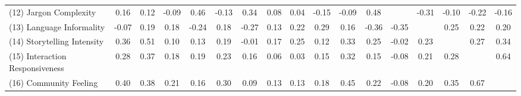 \begin{landscape}
\begin{table}[!ht]
\begin{tabular}{lcccccccccccccccc}
      (12) Jargon Complexity          & 0.16  & 0.12 & -0.09 & 0.46  & -0.13 & 0.34  & 0.08  & 0.04  & -0.15 & -0.09 & 0.48  &       & -0.31 & -0.10 & -0.22 & -0.16 \\
      (13) Language Informality       & -0.07 & 0.19 & 0.18  & -0.24 & 0.18  & -0.27 & 0.13  & 0.22  & 0.29  & 0.16  & -0.36 & -0.35 &       & 0.25  & 0.22  & 0.20  \\
      (14) Storytelling Intensity     & 0.36  & 0.51 & 0.10  & 0.13  & 0.19  & -0.01 & 0.17  & 0.25  & 0.12  & 0.33  & 0.25  & -0.02 & 0.23  &       & 0.27  & 0.34  \\
      (15) Interaction Responsiveness & 0.28  & 0.37 & 0.18  & 0.19  & 0.23  & 0.16  & 0.06  & 0.03  & 0.15  & 0.32  & 0.15  & -0.08 & 0.21  & 0.28  &       & 0.64  \\
      (16) Community Feeling          & 0.40  & 0.38 & 0.21  & 0.16  & 0.30  & 0.09  & 0.13  & 0.13  & 0.18  & 0.45  & 0.22  & -0.08 & 0.20  & 0.35  & 0.67  &       \\ \hline
    \end{tabular}
  \end{table}

\end{landscape}
